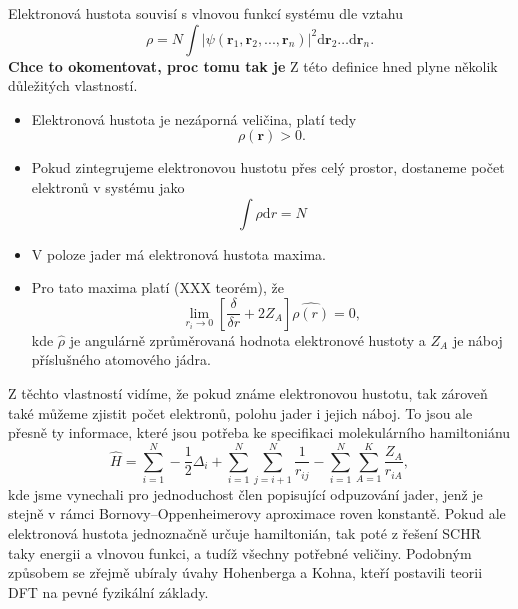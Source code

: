 Elektronová hustota souvisí s vlnovou funkcí systému dle vztahu
\begin{equation}
\rho=N \int |\psi(\textbf{r}_1,\textbf{r}_2,...,\textbf{r}_n)|^2 \mathrm{d}\textbf{r}_2\dots\mathrm{d}\textbf{r}_n .
\end{equation}
\textbf{Chce to okomentovat, proc tomu tak je} Z této definice hned plyne několik důležitých vlastností.

\begin{itemize}
\item Elektronová hustota je nezáporná veličina, platí tedy
\begin{equation}
\rho(\mathbf{r})  > 0 .
\end{equation}
\item Pokud zintegrujeme elektronovou hustotu přes celý prostor, dostaneme počet elektronů v systému jako
\begin{equation}
\int \rho\mathrm{d}r = N
\end{equation}

\item V poloze jader má elektronová hustota maxima.
\item Pro tato maxima platí (XXX teorém), že
\begin{equation}
\lim_{r_i \to 0} \left[ \frac{\delta}{\delta r}+2Z_A\right]\hat{\rho(r)}=0, 
\end{equation}
kde $\hat{\rho}$ je angulárně zprůměrovaná hodnota elektronové hustoty a $Z_A$ je náboj příslušného atomového jádra.
\end{itemize}

Z těchto vlastností vidíme, že pokud známe elektronovou hustotu, tak zároveň také můžeme zjistit počet elektronů, polohu jader i jejich náboj. To jsou ale přesně ty informace, které jsou potřeba ke specifikaci molekulárního hamiltoniánu
\begin{equation}
\hat{H}=\sum_{i=1}^N -\frac{1}{2}\Delta_i+\sum_{i=1}^N\sum_{j=i+1}^N\frac{1}{r_{ij}}-\sum_{i=1}^N\sum_{A=1}^K \frac{Z_A}{r_{iA}} ,
\label{rov:ham_dft}
\end{equation}
kde jsme vynechali pro jednoduchost člen popisující odpuzování jader, jenž je stejně v rámci Bornovy--Oppenheimerovy aproximace roven konstantě. Pokud ale elektronová hustota jednoznačně určuje hamiltonián, tak poté z řešení SCHR taky energii a vlnovou funkci, a tudíž všechny potřebné veličiny. Podobným způsobem se zřejmě ubíraly úvahy Hohenberga a Kohna, kteří postavili teorii DFT na pevné fyzikální základy.

